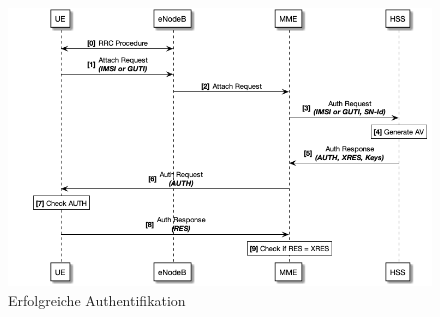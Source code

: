 \begin{figure}[H]
  \centering
  \includegraphics[width=\textwidth]{uml/4g-protocol_v1.png}
  \caption{Erfolgreiche Authentifikation}
  \label{fig:protocol_v1}
\end{figure} %

